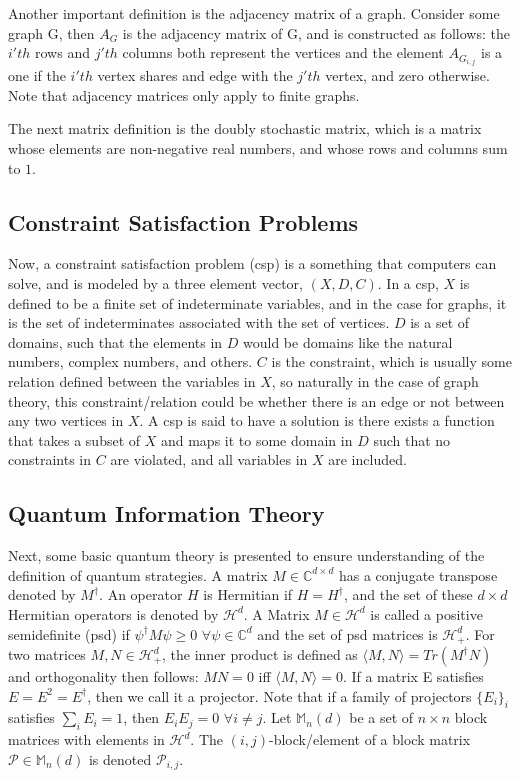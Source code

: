 \documentclass[12pt]{article}
\begin{document}
Another important definition is the adjacency matrix of a
graph. Consider some graph G, then $A_G$ is the adjacency matrix of G,
and is constructed as follows: the $i'th$ rows and $j'th$ columns both
represent the vertices and the element $A_{G_{i, j}}$ is a one if the
$i'th$ vertex shares and edge with the $j'th$ vertex, and zero
otherwise. Note that adjacency matrices only apply to finite graphs.

The next matrix definition is the \hypertarget{stochastic}{doubly
  stochastic matrix}, which is a matrix whose elements are
non-negative real numbers, and whose rows and columns sum to $1$.

\subsection{Constraint Satisfaction Problems}
\label{ssec:csp}

Now, a constraint satisfaction problem (csp) is a something that
computers can solve, and is modeled by a three element vector, $(X,
D, C)$. In a csp, $X$ is defined to be a finite set of indeterminate
variables, and in the case for graphs, it is the set of indeterminates
associated with the set of vertices. $D$ is a set of domains, such
that the elements in $D$ would be domains like the natural numbers,
complex numbers, and others. $C$ is the constraint, which is usually
some relation defined between the variables in $X$, so naturally in
the case of graph theory, this constraint/relation could be whether
there is an edge or not between any two vertices in $X$. A csp is said
to have a solution is there exists a function that takes a subset of
$X$ and maps it to some domain in $D$ such that no constraints in $C$
are violated, and all variables in $X$ are included.

\subsection{Quantum Information Theory}
\label{ssec:qit}

Next, some basic quantum theory is presented to ensure understanding
of the definition of quantum strategies. A matrix $M \in \mathbb{C}^{d
  \times d}$ has a conjugate transpose denoted by $M^\dag$. An
operator $H$ is Hermitian if $H = {H^{\dag}}$, and the set of these $d
\times d$ Hermitian operators is denoted by $\mathcal{H}^d$. A Matrix
$M \in \mathcal{H}^d$ is called a positive semidefinite (psd) if
$\psi^\dag M \psi \geq 0$ $\forall \psi \in \mathbb{C}^d$ and the set
of psd matrices is $\mathcal{H}^d_+$. For two matrices $M, N \in
\mathcal{H}^d_+$, the inner product is defined as $\langle M, N\rangle
= Tr(M^\dag N)$ and orthogonality then follows: $MN = 0$ iff $\langle
M, N \rangle = 0$. If a matrix E satisfies $E = E^2 = E^\dag$, then we
call it a projector. Note that if a family of projectors $\{E_i\}_i$
satisfies $\sum_iE_i = 1$, then $E_iE_j = 0$ $\forall i \neq j$. Let
$\mathbb{M}_n(d)$ be a set of $n \times n$ block matrices with
elements in $\mathcal{H}^d$. The $(i, j)$-block/element of a block
matrix $\mathcal{P} \in \mathbb{M}_n(d)$ is denoted $\mathcal{P}_{i,
  j}$.
\end{document}
